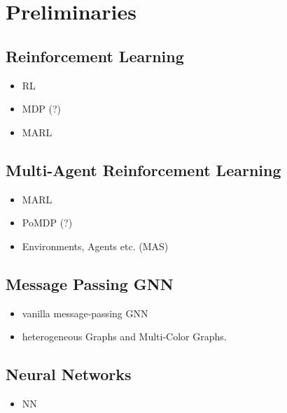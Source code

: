 
\chapter{Preliminaries}
\section{Reinforcement Learning}
\begin{itemize}[noitemsep,nolistsep]
	\item RL
	\item MDP (?)
	\item MARL
\end{itemize}

\section{Multi-Agent Reinforcement Learning}
\begin{itemize}[noitemsep,nolistsep]
	\item MARL
	\item PoMDP (?)
	\item Environments, Agents etc. (MAS)
\end{itemize}

\section{Message Passing GNN}
\begin{itemize}[noitemsep,nolistsep]
	\item vanilla message-passing GNN
	\item heterogeneous Graphs and Multi-Color Graphs.
\end{itemize}

\section{Neural Networks}
\begin{itemize}[noitemsep,nolistsep]
	\item NN
\end{itemize}